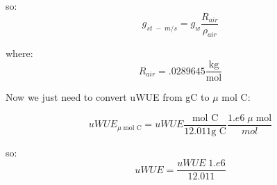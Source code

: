 so:
\begin{equation}
  g_{st\; -\; m/s} = g_w \frac{R_{air}}{\rho_{air}}
\end{equation}

where:
\begin{equation}
  R_{air} = .0289645 \frac{\text{kg}}{\text{mol}}
\end{equation}

Now we just need to convert uWUE from gC to $\mu$ mol C:

\begin{equation}
uWUE_{\mu \; \text{mol C}} = uWUE \frac{ \text{mol C}}{12.011 \text{g C}} \frac{1.e6 \; \mu \; \text{mol}}{mol}
\end{equation}

so:
\begin{equation}
  uWUE = \frac{uWUE \;1.e6}{ 12.011}
\end{equation}

